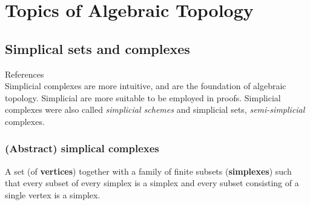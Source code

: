 \part{Topics of Algebraic Topology}



\chapter{Simplical sets and complexes}
References \cite{goerssSimplicialHomotopyTheory2009,hatcherAlgebraicTopology2021}\\

Simplicial complexes are more intuitive, and are the foundation of algebraic topology. Simplicial are more suitable to be employed in proofs. Simplicial complexes were also called \textit{simplicial schemes} and simplicial sets, \textit{semi-simplicial} complexes. 

\section{(Abstract) simplical complexes}

A set (of \textbf{vertices}) together with a  family of finite subsets (\textbf{simplexes}) such that every subset of every simplex is a simplex and every subset consisting of a single vertex is a simplex.  

